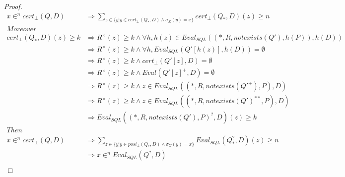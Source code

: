 \begin{proof}
\begin{align*}
		x \in^n cert_\bot(Q,D) & \Rightarrow \sum_{z \in \{y | y \in cert_\bot(Q_*,D) \land \sigma_\Sigma(y) = x \} }{cert_\bot(Q_*,D)(z)} \geq n \\
		Moreover\\
		cert_\bot(Q_*,D)(z)  \geq k  & \Rightarrow  R^\times(z) \geq k \land \forall h, h(z) \in  Eval_{SQL}((*,R,notexists(Q'),h(P)),h(D)) \\
		& \Rightarrow  R^\times(z) \geq k \land  \forall h, Eval_{SQL}(Q'[h(z)],h(D)) = \emptyset \\
		&  \Rightarrow  R^\times(z) \geq k \land  cert_\bot(Q'[z],D) = \emptyset \\
		&  \Rightarrow  R^\times(z) \geq k \land  Eval(Q'[z]^+,D) = \emptyset \\
		&  \Rightarrow  R^\times(z) \geq k \land z \in Eval_{SQL}((*,R,notexists(Q'^+),P),D) \\
		&  \Rightarrow  R^\times(z) \geq k \land z \in Eval_{SQL}((*,R,notexists(Q')^{**},P),D) \\
		&  \Rightarrow  Eval_{SQL}((*,R,notexists(Q'),P)^?,D)(z) \geq k \\
		Then \\
		x \in^n cert_\bot(Q,D) &\Rightarrow  \sum_{z \in \{y | y \in posi_\bot(Q_*,D) \land \sigma_\Sigma(y) = x \} }{Eval_{SQL}(Q_*^?,D)(z)} \geq n \\
		& \Rightarrow x \in^n Eval_{SQL}(Q^?,D) \\
	\end{align*}
\end{proof}

